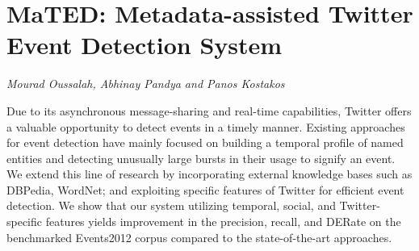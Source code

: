 \documentclass[../booklet.tex]{subfiles}
\begin{document}
\section[MaTED: Metadata-assisted Twitter Event Detection System. {\it Mourad Oussalah, Abhinay Pandya and Panos Kostakos}]{MaTED: Metadata-assisted Twitter Event Detection System}
  

\begin{center}
  {\it Mourad Oussalah, Abhinay Pandya and Panos Kostakos}
\end{center}

\vskip 0.8cm


Due to its asynchronous message-sharing and real-time capabilities, Twitter offers a valuable opportunity to detect events in a timely manner. Existing approaches for event detection have mainly focused on building a temporal profile of named entities and detecting unusually large bursts in their usage to signify an event. We extend this line of research by incorporating external knowledge bases such as DBPedia, WordNet; and exploiting specific features of Twitter for efficient event detection. We show that our system utilizing temporal, social, and Twitter-specific features yields improvement in the precision, recall, and DERate on the benchmarked Events2012 corpus compared to the state-of-the-art approaches.

\end{document}
